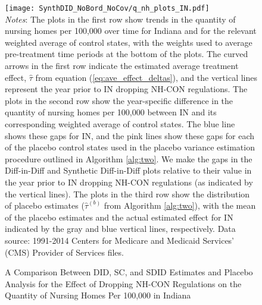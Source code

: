 \documentclass[../Main.tex]{subfiles}
\begin{document}
\newpage
{}
\begin{figure}[t] 
    \setlength{}
	\caption{\label{fig:q_nh_plots_in} \centering A Comparison Between DID, SC, and SDID Estimates and Placebo Analysis for the Effect of Dropping NH-CON Regulations on the Quantity of Nursing Homes Per 100,000 in Indiana} {\centering\texttt{[image: SynthDID\_NoBord\_NoCov/q\_nh\_plots\_IN.pdf]}}
    \vspace{-1.4cm}\\
    \scriptsize
		\textit{Notes}: The plots in the first row show trends in the quantity of nursing homes per 100,000 over time for Indiana and for the relevant weighted average of control states, with the weights used to average pre-treatment time periods at the bottom of the plots. The curved arrows in the first row indicate the estimated average treatment effect, $\hat{\tau}$ from equation (\ref{eq:ave_effect_deltas}), and the vertical lines represent the year prior to IN dropping NH-CON regulations. The plots in the second row show the year-specific difference in the quantity of nursing homes per 100,000 between IN and its corresponding weighted average of control states. The blue line shows these gaps for IN, and the pink lines show these gaps for each of the placebo control states used in the placebo variance estimation procedure outlined in Algorithm \ref{alg:two}. We make the gaps in the Diff-in-Diff and Synthetic Diff-in-Diff plots relative to their value in the year prior to IN dropping NH-CON regulations (as indicated by the vertical lines). The plots in the third row show the distribution of placebo estimates ($\hat{\tau}^{(b)}$ from Algorithm \ref{alg:two}), with the mean of the placebo estimates and the actual estimated effect for IN indicated by the gray and blue vertical lines, respectively. Data source: 1991-2014 Centers for Medicare and Medicaid Services’ (CMS) Provider of Services files.
\end{figure}
\restoregeometry
\clearpage
\end{document}
